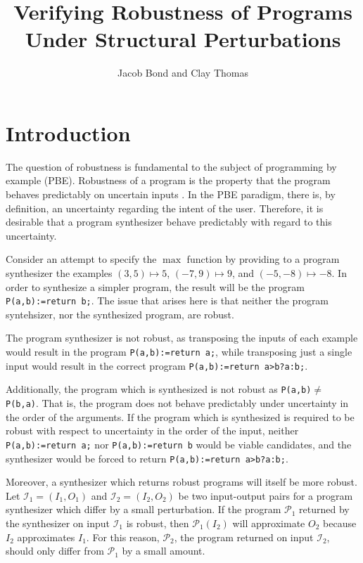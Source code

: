 \documentclass{llncs}
\title{Verifying Robustness of Programs Under Structural Perturbations}
\author{Jacob Bond and Clay Thomas}
\institute{Purdue University}
\begin{document}
\maketitle


\vspace{-0.075in}
\section{Introduction}
\vspace{-0.05in}

The question of robustness is fundamental to the subject of programming by
example (PBE).  Robustness of a program is the property that the program behaves
predictably on uncertain inputs \cite{chaudhuri12}.  In the PBE paradigm, there
is, by definition, an uncertainty regarding the intent of the user.  Therefore,
it is desirable that a program synthesizer behave predictably with regard to
this uncertainty.

Consider an attempt to specify the \(\max\) function by providing to a program
synthesizer the examples \((3, 5) \mapsto 5\), \((-7, 9) \mapsto 9\), and
\((-5, -8) \mapsto -8\).  In order to synthesize a simpler program, the
result will be the program \verb!P(a,b):=return b;!.  The issue that arises here
is that neither the program syntehsizer, nor the synthesized program, are
robust.

The program synthesizer is not robust, as transposing the inputs of each example
would result in the program \verb!P(a,b):=return a;!, while transposing just a
single input would result in the correct program \verb!P(a,b):=return a>b?a:b;!.

Additionally, the program which is synthesized is not robust as
\verb!P(a,b)!\(\not=\) \verb!P(b,a)!.  That is, the program does not behave
predictably under uncertainty in the order of the arguments.  If the program
which is synthesized is required to be robust with respect to uncertainty in the
order of the input, neither \verb!P(a,b):=return a;! nor \verb!P(a,b):=return b!
would be viable candidates, and the synthesizer would be forced to return
\verb!P(a,b):=return a>b?a:b;!.

Moreover, a synthesizer which returns robust programs will itself be more
robust.  Let \(\mathcal{I}_{1} = (I_{1}, O_{1})\) and \(\mathcal{I}_{2} =
(I_{2}, O_{2})\) be two input-output pairs for a program synthesizer which
differ by a small perturbation.  If the program \(\mathcal{P}_{1}\) returned by
the synthesizer on input \(\mathcal{I}_{1}\) is robust, then
\(\mathcal{P}_{1}(I_{2})\) will approximate \(O_{2}\) because \(I_{2}\)
approximates \(I_{1}\).  For this reason, \(\mathcal{P}_{2}\), the program
returned on input \(\mathcal{I}_{2}\), should only differ from
\(\mathcal{P}_{1}\) by a small amount.
\end{document}
